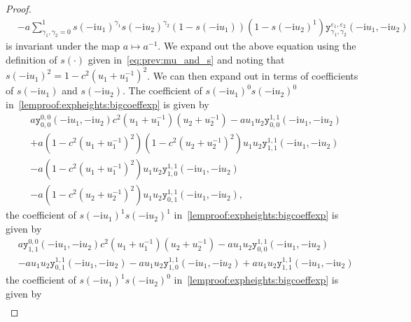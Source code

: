 \documentclass[11pt,twoside]{amsart}
\theoremstyle{plain}
\numberwithin{quest}{section}
\theoremstyle{remark}
\numberwithin{rem}{section}
\theoremstyle{definition}
\newcommand{\eps}{\varepsilon}
\begin{document}
\begin{proof}
\begin{equation}
\begin{split}
				&-a\sum_{\gamma_1,\gamma_2=0}^1s(-\mathrm{i} u_1)^{\gamma_1}s(-\mathrm{i} u_2)^{\gamma_2}(1-s(-\mathrm{i} u_1))(1-s(-\mathrm{i} u_2)^{1})\mathtt{y}_{\gamma_1,\gamma_2}^{\eps_1,\eps_2}(-\mathrm{i}u_1 ,- \mathrm{i} u_2)
			\end{split}
		\end{equation}
		is invariant under the map $a \mapsto a^{-1}$.  We expand out the above equation using the definition of $s(\cdot)$ given in~\eqref{eq:prev:mu_and_s} and noting that $s(-\mathrm{i} u_1)^2 = 1-c^2(u_1+u_1^{-1})^2$.  We can then expand out in terms of coefficients of $s(-\mathrm{i} u_1)$ and $s(-\mathrm{i}u_2)$.  The coefficient of $s(-\mathrm{i}u_1)^0s(-\mathrm{i}u_2)^0$ in~\eqref{lemproof:expheights:bigcoeffexp} is given by 
		\begin{equation}\label{lemproof:expheights:bigcoeffexp1}
			\begin{split}
				&a \mathtt{y}_{0,0}^{0,0}(-\mathrm{i}u_1,-\mathrm{i}u_2) c^2(u_1+u_1^{-1})(u_2+u_2^{-1}) - au_1u_2 \mathtt{y}_{0,0}^{1,1}(-\mathrm{i}u_1,-\mathrm{i}u_2)\\
				&+a (1-c^2(u_1+u_1^{-1})^2) (1-c^2(u_2+u_2^{-1})^2) u_1 u_2\mathtt{y}_{1,1}^{1,1}(-\mathrm{i}u_1,-\mathrm{i}u_2)\\
				&-a(1-c^2(u_1+u_1^{-1})^2)u_1u_2\mathtt{y}_{1,0}^{1,1}(-\mathrm{i}u_1,-\mathrm{i}u_2)\\
				&-a(1-c^2(u_2+u_2^{-1})^2)u_1u_2\mathtt{y}_{0,1}^{1,1}(-\mathrm{i}u_1,-\mathrm{i}u_2),
			\end{split}
		\end{equation}
		the coefficient of $s(-\mathrm{i}u_1)^1s(-\mathrm{i}u_2)^1$ in~\eqref{lemproof:expheights:bigcoeffexp} is given by 
		\begin{equation}
			\begin{split}\label{lemproof:expheights:bigcoeffexp2}
				&a \mathtt{y}_{1,1}^{0,0}(-\mathrm{i}u_1,-\mathrm{i}u_2) c^2(u_1+u_1^{-1})(u_2+u_2^{-1})-au_1 u_2\mathtt{y}_{0,0}^{1,1}(-\mathrm{i}u_1,-\mathrm{i}u_2)\\
				&-a u_1 u_2\mathtt{y}_{0,1}^{1,1}(-\mathrm{i}u_1,-\mathrm{i}u_2)-au_1 u_2\mathtt{y}_{1,0}^{1,1}(-\mathrm{i}u_1,-\mathrm{i}u_2)+au_1 u_2\mathtt{y}_{1,1}^{1,1}(-\mathrm{i}u_1,-\mathrm{i}u_2)
			\end{split}
		\end{equation}
		the coefficient of $s(-\mathrm{i}u_1)^1s(-\mathrm{i}u_2)^0$ in~\eqref{lemproof:expheights:bigcoeffexp} is given by 
		\begin{equation}
			\begin{split}\label{lemproof:expheights:bigcoeffexp3}

\end{split}
\end{equation}
\end{proof}
\end{document}
